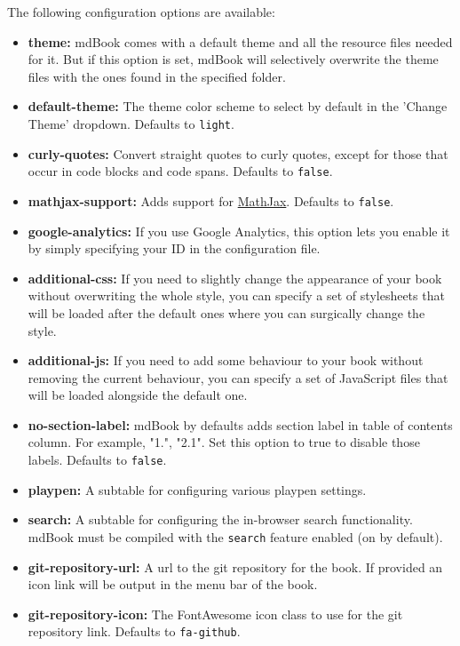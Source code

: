 \documentclass{article}
\begin{document}
The following configuration options are available:\\
\begin{itemize}
\item \textbf{theme:} mdBook comes with a default theme and all the resource files needed
for it. But if this option is set, mdBook will selectively overwrite the theme
files with the ones found in the specified folder.
\item \textbf{default-theme:} The theme color scheme to select by default in the
'Change Theme' dropdown. Defaults to \lstinline|light|.
\item \textbf{curly-quotes:} Convert straight quotes to curly quotes, except for those
that occur in code blocks and code spans. Defaults to \lstinline|false|.
\item \textbf{mathjax-support:} Adds support for \hyperref[MathJax Support]{MathJax}. Defaults to
\lstinline|false|.
\item \textbf{google-analytics:} If you use Google Analytics, this option lets you enable
it by simply specifying your ID in the configuration file.
\item \textbf{additional-css:} If you need to slightly change the appearance of your book
without overwriting the whole style, you can specify a set of stylesheets that
will be loaded after the default ones where you can surgically change the
style.
\item \textbf{additional-js:} If you need to add some behaviour to your book without
removing the current behaviour, you can specify a set of JavaScript files that
will be loaded alongside the default one.
\item \textbf{no-section-label:} mdBook by defaults adds section label in table of
contents column. For example, "1.", "2.1". Set this option to true to disable
those labels. Defaults to \lstinline|false|.
\item \textbf{playpen:} A subtable for configuring various playpen settings.
\item \textbf{search:} A subtable for configuring the in-browser search functionality.
mdBook must be compiled with the \lstinline|search| feature enabled (on by default).
\item \textbf{git-repository-url:}  A url to the git repository for the book. If provided
an icon link will be output in the menu bar of the book.
\item \textbf{git-repository-icon:} The FontAwesome icon class to use for the git
repository link. Defaults to \lstinline|fa-github|.
\end{itemize}
\end{document}
